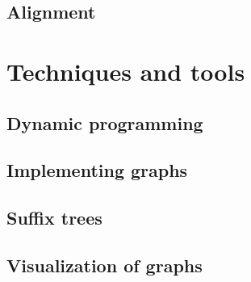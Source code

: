 \documentclass[thesis.tex]{subfiles}
\begin{document}
\subsection{Alignment}
\section{Techniques and tools}
\subsection{Dynamic programming}
\label{sec:dynamic_programming}
\subsection{Implementing graphs}
\subsection{Suffix trees}
\subsection{Visualization of graphs}
\end{document}
